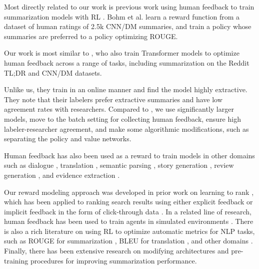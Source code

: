 Most directly related to our work is previous work using human feedback to train summarization models with RL \cite{bohm2019better,ziegler2019fine}. Bohm et al.\@ \cite{bohm2019better} learn a reward function from a dataset of human ratings of 2.5k CNN/DM summaries, and train a policy whose summaries are preferred to a policy optimizing ROUGE.  

Our work is most similar to \cite{ziegler2019fine}, who also train Transformer models \cite{vaswani2017attention} to optimize human feedback across a range of tasks, including summarization on the Reddit TL;DR and CNN/DM datasets. 

Unlike us, they train in an online manner and find the model highly extractive.  They note that their labelers prefer extractive summaries and have low agreement rates with researchers. Compared to \cite{ziegler2019fine}, we use significantly larger models, move to the batch setting for collecting human feedback, ensure high labeler-researcher agreement, and make some algorithmic modifications, such as separating the policy and value networks. 

Human feedback has also been used as a reward to train models in other domains such as dialogue \cite{jaques2019way,yi2019towards,hancock2019learning}, translation  \cite{kreutzer2018can,bahdanau2016actor}, semantic parsing \cite{lawrence2018improving}, story generation \cite{zhou2020learning}, review generation \cite{cho2018towards}, and evidence extraction \cite{perez2019finding}.

Our reward modeling approach was developed in prior work on learning to rank \cite{liu2011learning}, which has been applied to ranking search results using either explicit feedback \cite{bartell1994automatic,fuhr1989optimum} or implicit feedback in the form of click-through data \cite{joachims2002optimizing,joachims2005accurately}. In a related line of research, human feedback has been used to train agents in simulated environments \cite{christiano2017deep,ibarz2018reward}. There is also a rich literature on using RL to optimize automatic metrics for NLP tasks, such as ROUGE for summarization \cite{ranzato2015sequence,wu2018learning,paulus2017deep,dong2018banditsum,gao2019reward}, BLEU for translation \cite{ranzato2015sequence,wu2016google,bahdanau2016actor,nguyen2017reinforcement}, and other domains \cite{tambwekar2018controllable,jaques2017tuning,jaques2017sequence}. Finally, there has been extensive research on modifying architectures \cite{hermann2015teaching,see2017get} and pre-training procedures \cite{zhang2019pegasus,lewis2019bart,raffel2019exploring,song2019mass,rothe2020leveraging,dong2019unified} for improving summarization performance.


